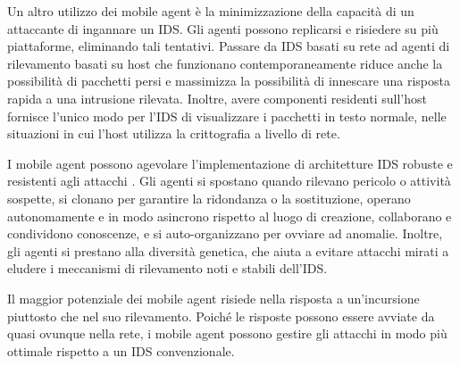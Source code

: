 Un altro utilizzo dei mobile agent è la minimizzazione della capacità di un attaccante di ingannare un IDS. Gli agenti possono replicarsi e risiedere su più piattaforme, eliminando tali tentativi. Passare da IDS basati su rete ad agenti di rilevamento basati su host che funzionano contemporaneamente riduce anche la possibilità di pacchetti persi e massimizza la possibilità di innescare una risposta rapida a una intrusione rilevata. Inoltre, avere componenti residenti sull'host fornisce l'unico modo per l'IDS di visualizzare i pacchetti in testo normale, nelle situazioni in cui l'host utilizza la crittografia a livello di rete.

I mobile agent possono agevolare l'implementazione di architetture IDS robuste e resistenti agli attacchi \cite{mell2000denial}. Gli agenti si spostano quando rilevano pericolo o attività sospette, si clonano per garantire la ridondanza o la sostituzione, operano autonomamente e in modo asincrono rispetto al luogo di creazione, collaborano e condividono conoscenze, e si auto-organizzano per ovviare ad anomalie. Inoltre, gli agenti si prestano alla diversità genetica, che aiuta a evitare attacchi mirati a eludere i meccanismi di rilevamento noti e stabili dell'IDS.

Il maggior potenziale dei mobile agent risiede nella risposta a un'incursione piuttosto che nel suo rilevamento. Poiché le risposte possono essere avviate da quasi ovunque nella rete, i mobile agent possono gestire gli attacchi in modo più ottimale rispetto a un IDS convenzionale.

